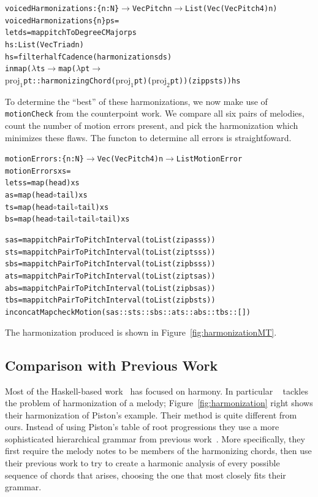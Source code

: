 \begin{alltt}
voicedHarmonizations : \{n : N\} \(\rightarrow\) Vec Pitch n \(\rightarrow\) List (Vec (Vec Pitch 4) n)
voicedHarmonizations \{n\} ps =
  let ds = map pitchToDegreeCMajor ps
      hs : List (Vec Triad n)
      hs = filter halfCadence (harmonizations ds)
      in map (\(\lambda\) ts \(\rightarrow\) map (\(\lambda\) pt \(\rightarrow\)
             \(\text{proj}_1\) pt :: harmonizingChord (\(\text{proj}_1\) pt) (\(\text{proj}_2\) pt)) (zip ps ts)) hs
\end{alltt}

To determine the ``best'' of these harmonizations, we now make use of
\texttt{motionCheck} from the counterpoint work. We compare all six
pairs of melodies, count the number of motion errors present, and pick
the harmonization which minimizes these flaws. The functon to
determine all errors is straightfoward.

\begin{alltt}
motionErrors : \{n : N\} \(\rightarrow\) Vec (Vec Pitch 4) n \(\rightarrow\) List MotionError
motionErrors xs =
  let ss = map (head) xs
      as = map (head \(\circ\) tail) xs
      ts = map (head \(\circ\) tail \(\circ\) tail) xs
      bs = map (head \(\circ\) tail \(\circ\) tail \(\circ\) tail) xs

      sas = map pitchPairToPitchInterval (toList (zip as ss))
      sts = map pitchPairToPitchInterval (toList (zip ts ss))
      sbs = map pitchPairToPitchInterval (toList (zip bs ss))
      ats = map pitchPairToPitchInterval (toList (zip ts as))
      abs = map pitchPairToPitchInterval (toList (zip bs as))
      tbs = map pitchPairToPitchInterval (toList (zip bs ts))
  in concatMap checkMotion (sas :: sts :: sbs :: ats :: abs :: tbs :: [])
\end{alltt}

The harmonization produced is shown in Figure~\ref{fig:harmonizationMT}.

\HarmonizationMT

\subsection{Comparison with Previous Work}
\label{sec:harmony:compare}

Most of the Haskell-based
work~\citep{magalhaes-harmtrace,koops-fharm,magalhaes-fcomp} has
focused on harmony. In particular \fharm~\citep{koops-fharm} tackles
the problem of harmonization of a melody;
Figure~\ref{fig:harmonization} right shows their harmonization of
Piston's example. Their method is quite different from
ours. Instead of using Piston's table of root progressions they use a
more sophisticated hierarchical grammar from previous
work~\citep{magalhaes-harmtrace}.
More specifically, they first require the melody notes to be members of
the harmonizing chords, then use their previous work to try to create
a harmonic analysis of every possible sequence of chords that arises,
choosing the one that most closely fits their grammar.

